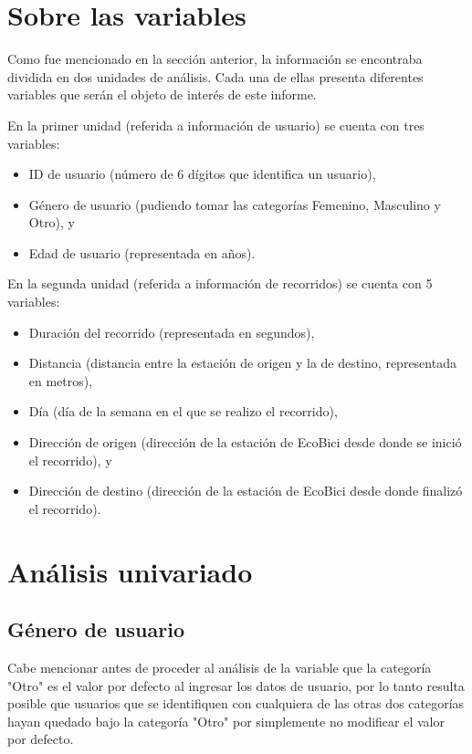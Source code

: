 \documentclass[11pt]{article}
\begin{document}
\section{Sobre las variables}
Como fue mencionado en la secci\'on anterior, la informaci\'on se encontraba dividida en dos unidades de an\'alisis.
Cada una de ellas presenta diferentes variables que ser\'an el objeto de inter\'es de este informe.
\par
En la primer unidad (referida a informaci\'on de usuario) se cuenta con tres variables: 
\begin{itemize}
    \item ID de usuario (n\'umero de 6 d\'igitos que identifica un usuario), 
    \item G\'enero de usuario (pudiendo tomar las categor\'ias Femenino, Masculino y Otro), y
    \item Edad de usuario (representada en a\~{n}os).
\end{itemize}

\par
En la segunda unidad (referida a informaci\'on de recorridos) se cuenta con 5 variables: 

\begin{itemize}
    \item Duraci\'on del recorrido (representada en segundos), 
    \item Distancia (distancia entre la estaci\'on de origen y la de destino, representada en metros), 
    \item D\'ia (d\'ia de la semana en el que se realizo el recorrido), 
    \item Direcci\'on de origen (direcci\'on de la estaci\'on de EcoBici desde donde se inici\'o el recorrido), y
    \item Direcci\'on de destino (direcci\'on de la estaci\'on de EcoBici desde donde finaliz\'o el recorrido). 
\end{itemize}

\section{An\'alisis univariado}

\subsection{G\'enero de usuario}

Cabe mencionar antes de proceder al an\'alisis de la variable que la categor\'ia "Otro" es el valor por defecto
al ingresar los datos de usuario, por lo tanto resulta posible que usuarios que se identifiquen con cualquiera
de las otras dos categor\'ias hayan quedado bajo la categor\'ia "Otro" por simplemente no modificar el valor por defecto.
\end{document}
